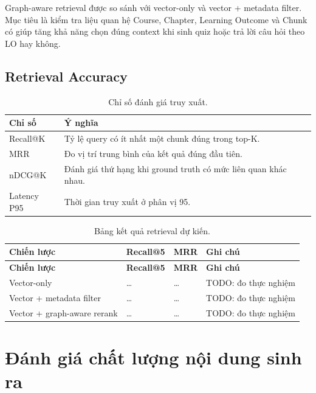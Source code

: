 Graph-aware retrieval được so sánh với vector-only và vector + metadata
filter. Mục tiêu là kiểm tra liệu quan hệ Course, Chapter, Learning Outcome và
Chunk có giúp tăng khả năng chọn đúng context khi sinh quiz hoặc trả lời câu
hỏi theo LO hay không.

\subsection{Retrieval Accuracy}

\begin{table}[H]
    \centering
    \caption{Chỉ số đánh giá truy xuất.}
    \label{tab:retrieval-metrics-lvtn}
    \begin{tabular}{|p{3cm}|p{10.5cm}|}
        \hline
        \textbf{Chỉ số} & \textbf{Ý nghĩa} \\
        \hline
        Recall@K & Tỷ lệ query có ít nhất một chunk đúng trong top-K. \\
        \hline
        MRR & Đo vị trí trung bình của kết quả đúng đầu tiên. \\
        \hline
        nDCG@K & Đánh giá thứ hạng khi ground truth có mức liên quan khác nhau. \\
        \hline
        Latency P95 & Thời gian truy xuất ở phân vị 95. \\
        \hline
    \end{tabular}
\end{table}

\begin{longtable}{|p{3cm}|p{3cm}|p{3cm}|p{4cm}|}
    \caption{Bảng kết quả retrieval dự kiến.} \label{tab:retrieval-results-lvtn} \\
    \hline
    \textbf{Chiến lược} & \textbf{Recall@5} & \textbf{MRR} & \textbf{Ghi chú} \\
    \hline
    \endfirsthead
    \hline
    \textbf{Chiến lược} & \textbf{Recall@5} & \textbf{MRR} & \textbf{Ghi chú} \\
    \hline
    \endhead

    Vector-only & \ldots & \ldots & TODO: đo thực nghiệm \\ \hline
    Vector + metadata filter & \ldots & \ldots & TODO: đo thực nghiệm \\ \hline
    Vector + graph-aware rerank & \ldots & \ldots & TODO: đo thực nghiệm \\ \hline
\end{longtable}

\section{Đánh giá chất lượng nội dung sinh ra}

